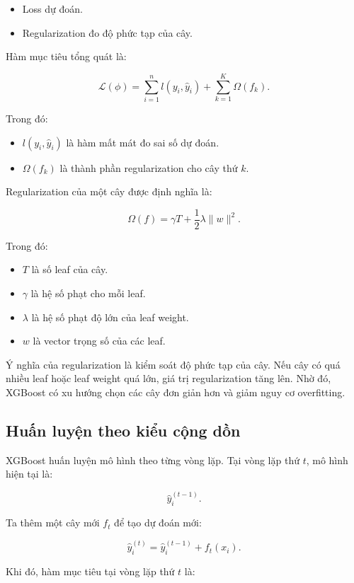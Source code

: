\begin{itemize}
    \item Loss dự đoán.
    \item Regularization đo độ phức tạp của cây.
\end{itemize}

Hàm mục tiêu tổng quát là:

\[
\mathcal{L}(\phi)
=
\sum_{i=1}^{n} l(y_i, \hat{y}_i)
+
\sum_{k=1}^{K} \Omega(f_k).
\]

Trong đó:

\begin{itemize}
    \item $l(y_i, \hat{y}_i)$ là hàm mất mát đo sai số dự đoán.
    \item $\Omega(f_k)$ là thành phần regularization cho cây thứ $k$.
\end{itemize}

Regularization của một cây được định nghĩa là:

\[
\Omega(f) = \gamma T + \frac{1}{2}\lambda \|w\|^2.
\]

Trong đó:

\begin{itemize}
    \item $T$ là số leaf của cây.
    \item $\gamma$ là hệ số phạt cho mỗi leaf.
    \item $\lambda$ là hệ số phạt độ lớn của leaf weight.
    \item $w$ là vector trọng số của các leaf.
\end{itemize}

Ý nghĩa của regularization là kiểm soát độ phức tạp của cây. Nếu cây có quá nhiều leaf hoặc leaf weight quá lớn, giá trị regularization tăng lên. Nhờ đó, XGBoost có xu hướng chọn các cây đơn giản hơn và giảm nguy cơ overfitting.

\subsection{Huấn luyện theo kiểu cộng dồn}

XGBoost huấn luyện mô hình theo từng vòng lặp. Tại vòng lặp thứ $t$, mô hình hiện tại là:

\[
\hat{y}_i^{(t-1)}.
\]

Ta thêm một cây mới $f_t$ để tạo dự đoán mới:

\[
\hat{y}_i^{(t)}
=
\hat{y}_i^{(t-1)} + f_t(x_i).
\]

Khi đó, hàm mục tiêu tại vòng lặp thứ $t$ là:

